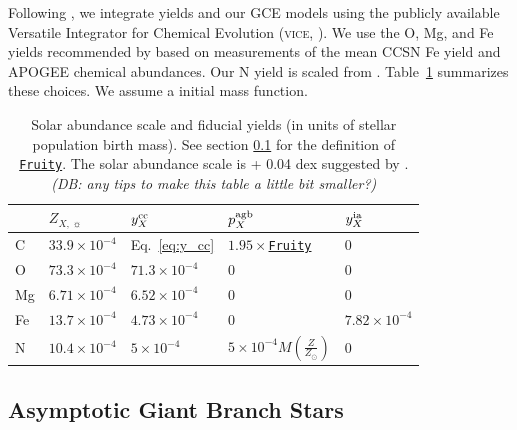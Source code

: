 \documentclass[fleqn,
usenatbib]{mnras}
\newcommand{\VICE}{\textsc{vice}}
\newcommand{\fruity}{\texttt{\hyperlink{fruity}{Fruity}}}
\newcommand{\cfactor}{1.95}
\newcommand{\y}{p}
\newcommand{\dbnote}[1]{ {\color{Thistle} \textit{\small (DB: #1)}} }
\begin{document}
Following \citet{james+23}, we integrate yields and our GCE models using the publicly available Versatile Integrator for Chemical Evolution (\VICE, \citealt{JW20}). We use the O, Mg, and Fe yields recommended by \citet{david_fe} based on measurements of the mean CCSN Fe yield \citep{rodriguez+23} and APOGEE chemical abundances.
Our N yield is scaled from \citep{james+23}.
Table~\ref{tab:fiducial_mod} summarizes these choices. 
We assume a \citet{kroupa01} initial mass function.


\begin{table}
	\centering
    \caption[]{Solar abundance scale and fiducial yields (in units of stellar population birth mass). See section \ref{sec:agb} for the definition of \fruity. The solar abundance scale is \citet{magg+22} + 0.04 dex suggested by \citet{david_fe}.
    \dbnote{any tips to make this table a little bit smaller?}
    }
	\label{tab:fiducial_mod}

	\begin{tabular}{l l l l l}
		\hline
         & $Z_{X,\,\sun}$ & $y_X^{\rm cc}$ & $\y_X^{\rm agb}$ & $y_X^{\rm ia}$  \\
		\hline
        C & $33.9\times10^{-4}$ & Eq.~\ref{eq:y_cc} & $\cfactor\times$\fruity &  0 \\
        O & $73.3\times10^{-4}$ & $71.3\times10^{-4}$ & 0 & 0 \\
        Mg & $6.71\times10^{-4}$ & $6.52\times 10^{-4}$ & 0 & 0 \\
        Fe & $13.7\times10^{-4}$ & $4.73\times10^{-4}$ & 0 & $7.82\times10^{-4}$ \\
        N & $10.4\times10^{-4}$ & $5\times10^{-4}$ & $5\times10^{-4}M\left(\frac{Z}{Z_\odot}\right)$ & 0\\
		\hline
	\end{tabular}
\end{table}


\subsection{Asymptotic Giant Branch Stars}\label{sec:agb}
\end{document}
